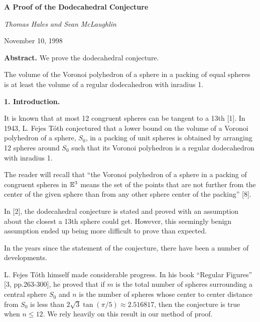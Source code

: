 \def\today{\ifcase\month\or
    January\or February\or March\or April\or May\or June\or
    July\or August\or September\or October\or November\or December\fi
    \space\number\day, \number\year}






\centerline{\bf{A Proof of the Dodecahedral Conjecture}}
\vskip 6pt
\centerline{\sl Thomas Hales and Sean McLaughlin}
\bigskip
\centerline{November 10, 1998}
\bigskip

{\bf Abstract.}  We prove the dodecahedral conjecture.

\bigskip

 The volume of the Voronoi polyhedron of a sphere in a packing 
of equal spheres is at least the volume of a regular dodecahedron with inradius 1.
 \endproclaim

\bigskip

\centerline {{ \bf 1. Introduction.}}

\bigskip



It is known that at most 12 congruent spheres can be tangent to a 13th [1]. 
In 1943, L. Fejes T\'oth conjectured that a lower bound on the volume of a 
Voronoi polyhedron of a sphere, $S_0$, in a packing of unit spheres is obtained
 by arranging 12 spheres around $S_0$ such that its Voronoi polyhedron is a 
regular dodecahedron with inradius 1. 

The reader will recall that ``the Voronoi polyhedron of a sphere in a packing of congruent
 spheres in $\Bbb E^3$ means the set of the points that are not further from the center of 
the given sphere than from any other sphere center of the packing'' [8].

In [2], the dodecahedral conjecture is stated and proved with an assumption 
about the closest
 a 13th sphere could get.  However, this seemingly benign assumption ended up being
 more difficult to prove than expected. 

In the years since the statement of the conjecture, there have been a number of 
developments.  

L. Fejes T\'oth himself made considerable progress.  In his book ``Regular Figures'' 
[3, pp.263-300], he proved that if $m$ is the total number of spheres surrounding 
a central sphere $S_0$ and $n$ is the number of spheres whose center to center 
distance from $S_0$ is less than  $2 \sqrt 3 \tan(\pi/5)\approx 2.516817$, then 
the conjecture is true when $n\leq 12$.  We rely heavily 
on this result in our method of proof.

